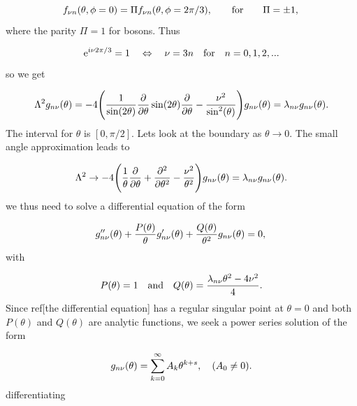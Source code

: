 \documentclass{article}
\newcommand{\me}{\mathrm{e}}
\numberwithin{equation}{section}
\numberwithin{figure}{section}
\begin{document}
\begin{equation}
f_{\nu n}(\theta,\phi = 0) = \Pi f_{\nu n}(\theta,\phi =2 \pi/3),  \qquad \text{for} \qquad  \Pi = \pm 1,\\
\end{equation}
where the parity $\Pi = 1$ for bosons. Thus

\begin{equation}
\me^{ i \nu 2\pi/3} = 1 \quad \Leftrightarrow  \quad \nu = 3n \quad \text{for} \quad n=0,1,2,...\\
\end{equation}
so we get

\begin{equation}
\Lambda^{2} g_{n \nu}(\theta) = -4\Bigg(\frac{1}{\sin(2\theta)} \frac{\partial}{\partial \theta} \sin(2\theta) \frac{\partial}{\partial \theta} - \frac{\nu^{2}}{\sin^{2}(\theta)}\Bigg) g_{n \nu}(\theta) = \lambda_{n \nu} g_{n \nu}(\theta).\\
\end{equation}
The interval for $\theta$ is $[0,\pi/2]$. Lets look at the boundary as $\theta \rightarrow 0$. The small angle approximation leads to

\begin{equation}
\Lambda^{2} \rightarrow -4\Bigg(\frac{1}{\theta} \frac{\partial}{\partial \theta} + \frac{\partial^{2}}{\partial \theta^{2}} - \frac{\nu^{2}}{\theta^{2}}\Bigg) g_{n \nu}(\theta) = \lambda_{n \nu} g_{n \nu}(\theta).\\
\end{equation}
we thus need to solve a differential equation of the form

\begin{equation}
g_{n\nu}''(\theta) + \frac{P(\theta)}{\theta}g_{n\nu}'(\theta) + \frac{Q(\theta)}{\theta^{2}}g_{n\nu}(\theta) = 0,\\
\end{equation}
with

\begin{equation}
P(\theta)=1 \quad \text{and} \quad Q(\theta)= \frac{\lambda_{n \nu}\theta^{2} - 4\nu^{2}}{4}.\\
\end{equation}
Since ref[the differential equation] has a regular singular point at $\theta = 0$ and both $P(\theta)$ and $Q(\theta)$ are analytic functions, we seek a power series solution of the form

\begin{equation}
g_{n\nu}(\theta) = \sum_{k=0}^{\infty} A_{k} \theta^{k+s}, \quad (A_{0} \neq 0).\\
\end{equation}
differentiating
\end{document}
